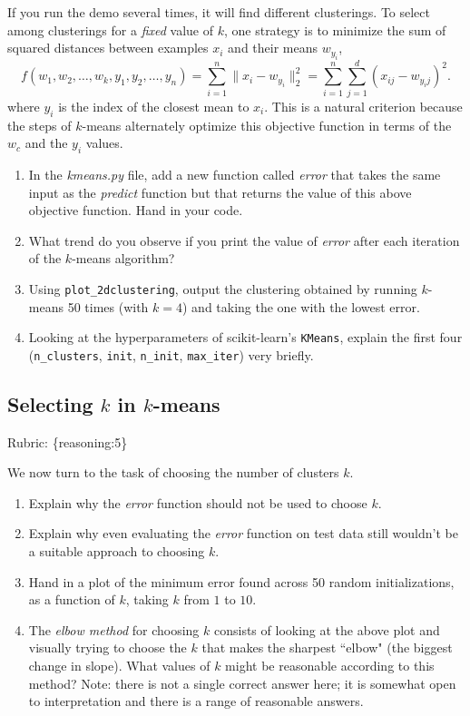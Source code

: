 \documentclass{article}
\def\blu#1{{\color{blu}#1}}
\def\gre#1{{\color{gre}#1}}
\def\norm#1{\|#1\|}
\def\enum#1{\begin{enumerate}#1\end{enumerate}}
\def\rubric#1{\gre{Rubric: \{#1\}}}{}
\begin{document}
If you run the demo several times, it will find different clusterings. To select among clusterings for a \emph{fixed} value of $k$, one strategy is to minimize the sum of squared distances between examples $x_i$ and their means $w_{y_i}$,
\[
f(w_1,w_2,\dots,w_k,y_1,y_2,\dots,y_n) = \sum_{i=1}^n \norm{x_i - w_{y_i}}_2^2 = \sum_{i=1}^n \sum_{j=1}^d (x_{ij} - w_{y_ij})^2.
\]
 where $y_i$ is the index of the closest mean to $x_i$. This is a natural criterion because the steps of $k$-means alternately optimize this objective function in terms of the $w_c$ and the $y_i$ values.

 \blu{\enum{
 \item In the \emph{kmeans.py} file, add a new function called \emph{error} that takes the same input as the \emph{predict} function but that returns the value of this above objective function. Hand in your code.
 \item What trend do you observe if you print the value of \emph{error} after each iteration of the $k$-means algorithm?
 \item Using \texttt{plot\_2dclustering}, output the clustering obtained by running $k$-means 50 times (with $k=4$) and taking the one with the lowest error.
 \item Looking at the hyperparameters of scikit-learn's \texttt{KMeans}, explain the first four (\texttt{n\_clusters}, \texttt{init}, \texttt{n\_init}, \texttt{max\_iter}) very briefly.
 }}


 \subsection{Selecting $k$ in $k$-means}
\rubric{reasoning:5}

 We now turn to the task of choosing the number of clusters $k$.

 \blu{\enum{
 \item Explain why the \emph{error} function should not be used to choose $k$.
 \item Explain why even evaluating the \emph{error} function on test data still wouldn't be a suitable approach to choosing $k$.
 \item Hand in a plot of the minimum error found across 50 random initializations, as a function of $k$, taking $k$ from $1$ to $10$.
 \item The \emph{elbow method} for choosing $k$ consists of looking at the above plot and visually trying to choose the $k$ that makes the sharpest ``elbow" (the biggest change in slope). What values of $k$ might be reasonable according to this method? Note: there is not a single correct answer here; it is somewhat open to interpretation and there is a range of reasonable answers.
 }}
\end{document}
